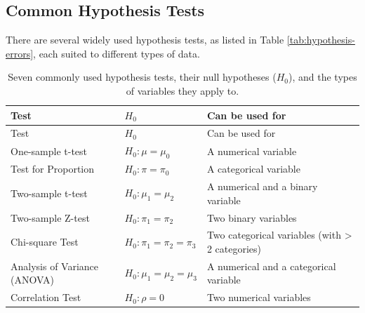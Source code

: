 \documentclass[
  11pt,
]{book}
\theoremstyle{definition}
\theoremstyle{definition}
\theoremstyle{definition}
\theoremstyle{definition}
\theoremstyle{remark}
\begin{document}
\subsection*{Common Hypothesis Tests}\label{common-hypothesis-tests}


There are several widely used hypothesis tests, as listed in Table \ref{tab:hypothesis-errors}, each suited to different types of data.

\begin{longtable}[]{@{}
  >{\raggedright\arraybackslash}p{}
  >{\raggedright\arraybackslash}p{}
  >{\raggedright\arraybackslash}p{}@{}}
\caption{\label{tab:hypothesis-test} Seven commonly used hypothesis tests, their null hypotheses (\(H_0\)), and the types of variables they apply to.}\tabularnewline
\toprule\noalign{}
\begin{minipage}[b]{\linewidth}\raggedright
Test
\end{minipage} & \begin{minipage}[b]{\linewidth}\raggedright
\(H_0\)
\end{minipage} & \begin{minipage}[b]{\linewidth}\raggedright
Can be used for
\end{minipage} \\
\midrule\noalign{}
\endfirsthead
\toprule\noalign{}
\begin{minipage}[b]{\linewidth}\raggedright
Test
\end{minipage} & \begin{minipage}[b]{\linewidth}\raggedright
\(H_0\)
\end{minipage} & \begin{minipage}[b]{\linewidth}\raggedright
Can be used for
\end{minipage} \\
\midrule\noalign{}
\endhead
\bottomrule\noalign{}
\endlastfoot
One-sample t-test & \(H_0: \mu = \mu_0\) & A numerical variable \\
Test for Proportion & \(H_0: \pi = \pi_0\) & A categorical variable \\
Two-sample t-test & \(H_0: \mu_1 = \mu_2\) & A numerical and a binary variable \\
Two-sample Z-test & \(H_0: \pi_1 = \pi_2\) & Two binary variables \\
Chi-square Test & \(H_0: \pi_1 = \pi_2 = \pi_3\) & Two categorical variables (with \textgreater{} 2 categories) \\
Analysis of Variance (ANOVA) & \(H_0: \mu_1 = \mu_2 = \mu_3\) & A numerical and a categorical variable \\
Correlation Test & \(H_0: \rho = 0\) & Two numerical variables \\
\end{longtable}
\end{document}
